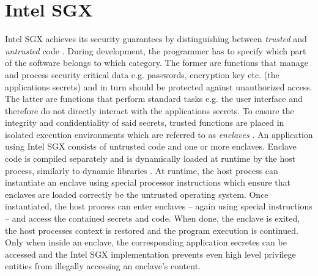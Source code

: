 \section{Intel SGX}
Intel SGX achieves its security guarantees by distinguishing between \textit{trusted} and \textit{untrusted} code \cite{IntelWebBasedTraining}. During development,
the programmer has to specify which part of the software belongs to which category. The former are functions that manage and process security critical data e.g. passwords,
encryption key etc. (the applications secrets) and in turn should be protected against unauthorized access. The latter are functions that perform standard tasks e.g. the
user interface and therefore do not directly interact with the applications secrets. To ensure the integrity and confidentiality of said secrets, trusted functions are 
placed in isolated execution environments which are referred to as \textit{enclaves} \cite{UseOfIntelSGX}. An application using Intel SGX consists of untrusted code and
one or more enclaves. Enclave code is compiled separately and is dynamically loaded at runtime by the host process, similarly to dynamic libraries \cite{Costan2016IntelSE}.
At runtime, the host process can instantiate an enclave using special processor instructions which ensure that enclaves are loaded correctly be the untrusted operating system.
Once instantiated, the host process can enter enclaves -- again using special instructions -- and access the contained secrets and code. When done, the enclave is exited,
the host processes context is restored and the program execution is continued. Only when inside an enclave, the corresponding application secretes can be accessed and the
Intel SGX implementation prevents even high level privilege entities from illegally accessing an enclave's content.